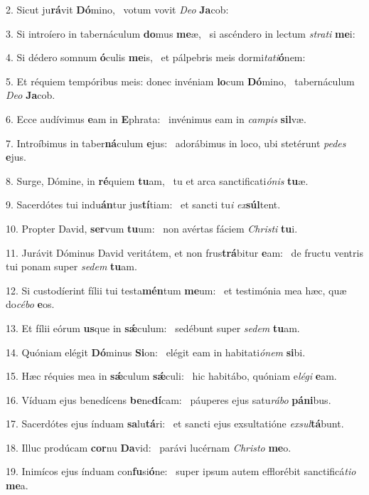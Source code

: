 2. Sicut ju\textbf{rá}vit \textbf{Dó}mino, \ast\  votum vovit \textit{De}\textit{o} \textbf{Ja}cob:\

3. Si introíero in tabernáculum \textbf{do}mus \textbf{me}æ, \ast\  si ascéndero in lectum \textit{stra}\textit{ti} \textbf{me}i:\

4. Si dédero somnum \textbf{ó}culis \textbf{me}is, \ast\  et pálpebris meis dormi\textit{ta}\textit{ti}\textbf{ó}nem:\

5. Et réquiem tempóribus meis: donec invéniam \textbf{lo}cum \textbf{Dó}mino, \ast\  tabernáculum \textit{De}\textit{o} \textbf{Ja}cob.\

6. Ecce audívimus \textbf{e}am in \textbf{E}phrata: \ast\  invénimus eam in \textit{cam}\textit{pis} \textbf{sil}væ.\

7. Introíbimus in taber\textbf{ná}culum \textbf{e}jus: \ast\  adorábimus in loco, ubi stetérunt \textit{pe}\textit{des} \textbf{e}jus.\

8. Surge, Dómine, in \textbf{ré}quiem \textbf{tu}am, \ast\  tu et arca sanctificati\textit{ó}\textit{nis} \textbf{tu}æ.\

9. Sacerdótes tui indu\textbf{án}tur jus\textbf{tí}tiam: \ast\  et sancti tu\textit{i} \textit{ex}\textbf{súl}tent.\

10. Propter David, \textbf{ser}vum \textbf{tu}um: \ast\  non avértas fáciem \textit{Chris}\textit{ti} \textbf{tu}i.\

11. Jurávit Dóminus David veritátem, et non frus\textbf{trá}bitur \textbf{e}am: \ast\  de fructu ventris tui ponam super \textit{se}\textit{dem} \textbf{tu}am.\

12. Si custodíerint fílii tui testa\textbf{mén}tum \textbf{me}um: \ast\  et testimónia mea hæc, quæ do\textit{cé}\textit{bo} \textbf{e}os.\

13. Et fílii eórum \textbf{us}que in \textbf{sǽ}culum: \ast\  sedébunt super \textit{se}\textit{dem} \textbf{tu}am.\

14. Quóniam elégit \textbf{Dó}minus \textbf{Si}on: \ast\  elégit eam in habitati\textit{ó}\textit{nem} \textbf{si}bi.\

15. Hæc réquies mea in \textbf{sǽ}culum \textbf{sǽ}culi: \ast\  hic habitábo, quóniam e\textit{lé}\textit{gi} \textbf{e}am.\

16. Víduam ejus benedícens \textbf{be}ne\textbf{dí}cam: \ast\  páuperes ejus satu\textit{rá}\textit{bo} \textbf{pá}\textbf{ni}bus.\

17. Sacerdótes ejus índuam \textbf{sa}lu\textbf{tá}ri: \ast\  et sancti ejus exsultatióne \textit{ex}\textit{sul}\textbf{tá}bunt.\

18. Illuc prodúcam \textbf{cor}nu \textbf{Da}vid: \ast\  parávi lucérnam \textit{Chris}\textit{to} \textbf{me}o.\

19. Inimícos ejus índuam con\textbf{fu}si\textbf{ó}ne: \ast\  super ipsum autem efflorébit sanctificá\textit{ti}\textit{o} \textbf{me}a.\

